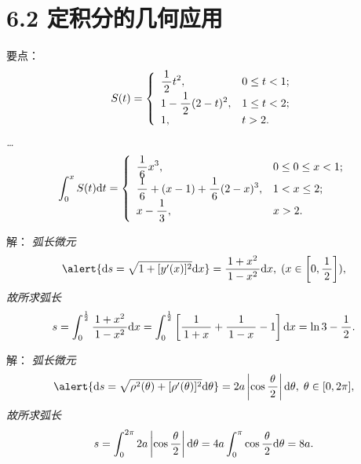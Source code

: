 \section{6.2 定积分的几何应用}

\begin{frame}
	\linespread{1.5}
	\pause
	
	
	\small 要点：\it
	$$S(t)=\left\{\begin{array}{ll}
		\displaystyle\frac{\,{1}\,}{\,{2}\,}t^2,& 0\leq t<1;\\ 1-\displaystyle\frac{\,{1}\,}{\,{2}\,}(2-t)^2, & 1\leq t <2;\\
		1,& t>2. 
	\end{array}\right.$$
	\ldots
	$$\displaystyle\int_0^xS(t)\mathrm{d} t=\left\{\begin{array}{ll}
		\displaystyle\frac{\,{1}\,}{\,{6}\,}x^3,& 0\leq 0\leq x<1;\\ 
		\displaystyle\frac{\,{1}\,}{\,{6}\,}+(x-1)+\displaystyle\frac{\,{1}\,}{\,{6}\,}(2-x)^3, & 1<x\leq2;\\
		x-\displaystyle\frac{\,{1}\,}{\,{3}\,},& x>2. 
	\end{array}\right.$$
\end{frame}

\begin{frame}
	\linespread{1.5}
	\pause
	
	
	\small 解：\it
	弧长微元
	$$\alert{\d s=\sqrt{1+[y'(x)]^2}\d x}=\df{1+x^2}{1-x^2}\d
	x,\;(x\in\left[0,\df12\right]),$$
	故所求弧长
	$$s=\displaystyle\int_0^{\frac12}\displaystyle\frac{\,{1+x^2}\,}{\,{1-x^2}\,}\mathrm{d} x
	=\displaystyle\int_0^{\frac12}\left[\displaystyle\frac{\,{1}\,}{\,{1+x}\,}+\displaystyle\frac{\,{1}\,}{\,{1-x}\,}-1\right]\mathrm{d} x
	=\ln3-\displaystyle\frac{\,{1}\,}{\,{2}\,}.$$
\end{frame}

\begin{frame}
	\linespread{1.5}
	\pause
	
	
	\small 解：\it
	弧长微元
	$$\alert{\d s=\sqrt{\rho^2(\theta)+[\rho'(\theta)]^2}\d\theta}
	=2a\left|\cos\df{\theta}2\right|\d\theta,\;\theta\in[0,2\pi],$$
	故所求弧长
	$$s=\displaystyle\int_0^{2\pi}2a\left|\cos\displaystyle\frac{\,{\theta}\,}{\,{2}\,}\right|\mathrm{d}\theta
	=4a\displaystyle\int_0^{\pi}\cos\displaystyle\frac{\,{\theta}\,}{\,{2}\,}\mathrm{d}\theta
	=8a.$$
\end{frame}

